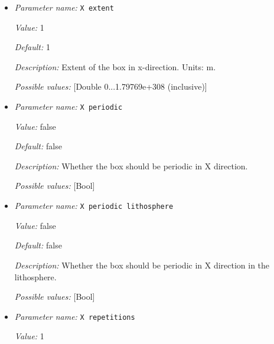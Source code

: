 \begin{itemize}
{\it Default:} 0.2


{\it Description:} The thickness of the lithosphere used to create additional boundary indicators to set specific boundary conditions for the lithosphere. 


{\it Possible values:} [Double 0...1.79769e+308 (inclusive)]
\item {\it Parameter name:} {\tt X extent}
\label{parameters:Geometry model/Box with lithosphere boundary indicators/X extent}


{\it Value:} 1


{\it Default:} 1


{\it Description:} Extent of the box in x-direction. Units: m.


{\it Possible values:} [Double 0...1.79769e+308 (inclusive)]
\item {\it Parameter name:} {\tt X periodic}
\label{parameters:Geometry model/Box with lithosphere boundary indicators/X periodic}


{\it Value:} false


{\it Default:} false


{\it Description:} Whether the box should be periodic in X direction.


{\it Possible values:} [Bool]
\item {\it Parameter name:} {\tt X periodic lithosphere}
\label{parameters:Geometry model/Box with lithosphere boundary indicators/X periodic lithosphere}


{\it Value:} false


{\it Default:} false


{\it Description:} Whether the box should be periodic in X direction in the lithosphere.


{\it Possible values:} [Bool]
\item {\it Parameter name:} {\tt X repetitions}
\label{parameters:Geometry model/Box with lithosphere boundary indicators/X repetitions}


{\it Value:} 1



\end{itemize}
